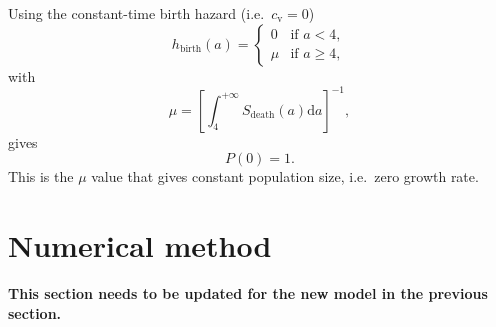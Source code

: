 \documentclass[12pt]{article}
\newcommand{\md}{\mathrm{d}}
\begin{document}
Using the constant-time birth hazard
(i.e.~$c_{\mathrm{v}} = 0$)
\begin{equation}
  h_{\text{birth}}(a) =
  \begin{cases}
    0 & \text{if $a < 4$}, \\
    \mu & \text{if $a \geq 4$},
  \end{cases}
\end{equation}
with
\begin{equation}
  \mu =
  \left[
    \int_4^{+\infty} S_{\text{death}}(a) \md a
  \right]^{-1},
\end{equation}
gives
\begin{equation}
  P(0) = 1.
\end{equation}
This is the $\mu$ value that gives constant population size,
i.e.~zero growth rate.


\section{Numerical method}

\textbf{This section needs to be updated for the new model in the
  previous section.}
\end{document}

